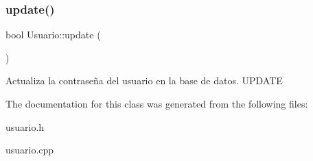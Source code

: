 \subsubsection{\texorpdfstring{update()}{update()}}
{\footnotesize\ttfamily bool Usuario\+::update (\begin{DoxyParamCaption}{ }\end{DoxyParamCaption})}

Actualiza la contraseña del usuario en la base de datos. U\+P\+D\+A\+TE 

The documentation for this class was generated from the following files\+:\begin{DoxyCompactItemize}
\item 
usuario.\+h\item 
usuario.\+cpp\end{DoxyCompactItemize}
